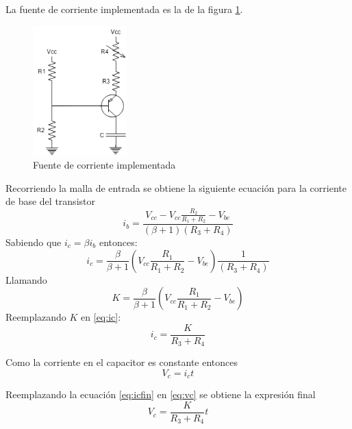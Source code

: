 \documentclass[../../ASSD_TP1_G7.tex]{subfiles}
\begin{document}
La fuente de corriente implementada es la de la figura \ref{fig:fuenteCorriente}. 
\begin{figure}[H]
\centering
\includegraphics[width=0.32\textwidth]{figures/fCorriente.png}
\caption{Fuente de corriente implementada}\label{fig:fuenteCorriente}
\end{figure}
Recorriendo la malla de entrada se obtiene la siguiente ecuación para la corriente de base del transistor
\begin{equation}
i_b=\frac{V_{cc}-V_{cc}\frac{R_2}{R_1 + R_2}-V_{be}}{(\beta + 1)(R_3 + R_4)}
\end{equation}
Sabiendo que $i_c=\beta i_b$ entonces:
\begin{equation}
i_c= \frac{\beta}{\beta + 1} \left( V_{cc} \frac{R_1}{R_1 + R_2} -V_{be} \right) \frac{1}{(R_3 + R_4)} \label{eq:ic}
\end{equation}
Llamando 
\begin{equation}
K=\frac{\beta}{\beta + 1} \left( V_{cc} \frac{R_1}{R_1 + R_2} -V_{be} \right)
\end{equation}
Reemplazando $K$ en \ref{eq:ic}:
\begin{equation}
i_c=\frac{K}{R_3 + R_4} \label{eq:icfin}
\end{equation}

Como la corriente en el capacitor es constante entonces
\begin{equation}
V_c=i_c t \label{eq:vc}
\end{equation}

Reemplazando la ecuación \ref{eq:icfin} en \ref{eq:vc} se obtiene la expresión final
\begin{equation}
V_c=\frac{K}{R_3 + R_4} t 
\end{equation}
\end{document}
